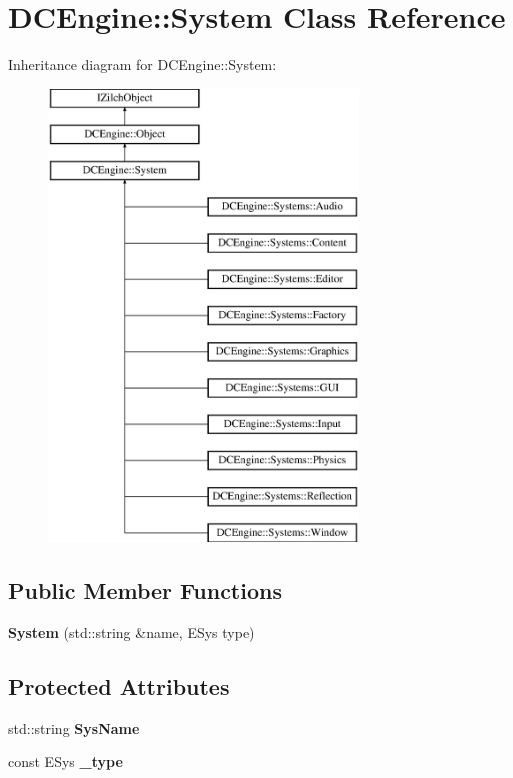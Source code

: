 \hypertarget{classDCEngine_1_1System}{\section{D\-C\-Engine\-:\-:System Class Reference}
\label{classDCEngine_1_1System}
}
Inheritance diagram for D\-C\-Engine\-:\-:System\-:\begin{figure}[H]
\begin{center}
\leavevmode
\includegraphics[height=12.000000cm]{classDCEngine_1_1System}
\end{center}
\end{figure}
\subsection*{Public Member Functions}
\begin{DoxyCompactItemize}
\item 
\hypertarget{classDCEngine_1_1System_ac0b8cac597bf207ccfd9bb60a8955e79}{{\bfseries System} (std\-::string \&name, E\-Sys type)}\label{classDCEngine_1_1System_ac0b8cac597bf207ccfd9bb60a8955e79}

\end{DoxyCompactItemize}
\subsection*{Protected Attributes}
\begin{DoxyCompactItemize}
\item 
\hypertarget{classDCEngine_1_1System_a08d5ac7b3ff3c4c5d26b080311971930}{std\-::string {\bfseries Sys\-Name}}\label{classDCEngine_1_1System_a08d5ac7b3ff3c4c5d26b080311971930}

\item 
\hypertarget{classDCEngine_1_1System_a5edcef5d0bed27b80ed6fa7437476fb7}{const E\-Sys {\bfseries \-\_\-type}}\label{classDCEngine_1_1System_a5edcef5d0bed27b80ed6fa7437476fb7}

\end{DoxyCompactItemize}

